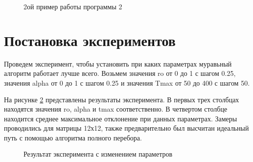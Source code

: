 \begin{figure}[h]
	\caption{2ой пример работы программы 2}
	\label{results2}
\end{figure}

\section{Постановка экспериментов}

Проведем эксперимент, чтобы установить при каких параметрах муравьный алгоритм работает лучше всего. Возьмем значения ro от 0 до 1 с шагом 0.25, значения alpha от 0 до 1 с шагом 0.25 и значения Tmax от 50 до 400 с шагом 50.

На рисунке \ref{times} представлены результаты эксперимента. В первых трех столбцах находятся значения ro, alpha и tmax соответственно. В четвертом столбце находится среднее максимальное отклонение при данных параметрах. 
Замеры проводились для матрицы 12х12, также предварительно был высчитан идеальный путь с помощью алгоритма полного перебора.

\begin{figure}[h]
	\caption{Результат эксперимента с изменением параметров}
	\label{times}
\end{figure}

